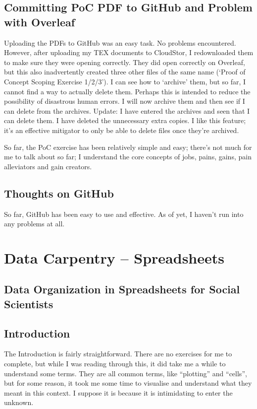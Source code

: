 \documentclass{article}
\begin{document}
\subsection{Committing PoC PDF to GitHub and Problem with Overleaf}
Uploading the PDFs to GitHub was an easy task. No problems encountered. However, after uploading my TEX documents to CloudStor, I redownloaded them to make sure they were opening correctly. They did open correctly on Overleaf, but this also inadvertently created three other files of the same name (‘Proof of Concept Scoping Exercise 1/2/3’). I can see how to ‘archive’ them, but so far, I cannot find a way to actually delete them. Perhaps this is intended to reduce the possibility of disastrous human errors. I will now archive them and then see if I can delete from the archives.
Update: I have entered the archives and seen that I can delete them. I have deleted the unnecessary extra copies. I like this feature; it’s an effective mitigator to only be able to delete files once they’re archived.

So far, the PoC exercise has been relatively simple and easy; there’s not much for me to talk about so far; I understand the core concepts of jobs, pains, gains, pain alleviators and gain creators.

\subsection{Thoughts on GitHub}
So far, GitHub has been easy to use and effective. As of yet, I haven’t run into any problems at all.

\section{Data Carpentry – Spreadsheets}
\subsection{Data Organization in Spreadsheets for Social Scientists}
\subsection{Introduction}
The Introduction is fairly straightforward. There are no exercises for me to complete, but while I was reading through this, it did take me a while to understand some terms. They are all common terms, like “plotting” and “cells”, but for some reason, it took me some time to visualise and understand  what they meant in this context. I suppose it is because it is intimidating to enter the unknown.
\end{document}
